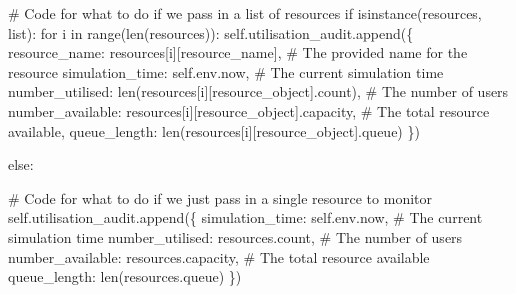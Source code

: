 \documentclass[
  letterpaper,
  DIV=11,
  numbers=noendperiod]{scrreprt}
\newenvironment{Shaded}{\begin{snugshade}}{\end{snugshade}}
\newcommand{\BuiltInTok}[1]{\textcolor[rgb]{0.00,0.23,0.31}{#1}}
\newcommand{\CommentTok}[1]{\textcolor[rgb]{0.37,0.37,0.37}{#1}}
\newcommand{\ControlFlowTok}[1]{\textcolor[rgb]{0.00,0.23,0.31}{#1}}
\newcommand{\KeywordTok}[1]{\textcolor[rgb]{0.00,0.23,0.31}{#1}}
\newcommand{\NormalTok}[1]{\textcolor[rgb]{0.00,0.23,0.31}{#1}}
\newcommand{\StringTok}[1]{\textcolor[rgb]{0.13,0.47,0.30}{#1}}
\newcommand{\VariableTok}[1]{\textcolor[rgb]{0.07,0.07,0.07}{#1}}
\begin{document}
\begin{tcolorbox}
\begin{Shaded}
\begin{Highlighting}[]
            \CommentTok{\# Code for what to do if we pass in a list of resources}
            \ControlFlowTok{if} \BuiltInTok{isinstance}\NormalTok{(resources, }\BuiltInTok{list}\NormalTok{):}
                \ControlFlowTok{for}\NormalTok{ i }\KeywordTok{in} \BuiltInTok{range}\NormalTok{(}\BuiltInTok{len}\NormalTok{(resources)):}
                    \VariableTok{self}\NormalTok{.utilisation\_audit.append(\{}
                        \StringTok{\textquotesingle{}resource\_name\textquotesingle{}}\NormalTok{: resources[i][}\StringTok{\textquotesingle{}resource\_name\textquotesingle{}}\NormalTok{], }\CommentTok{\# The provided name for the resource}
                        \StringTok{\textquotesingle{}simulation\_time\textquotesingle{}}\NormalTok{: }\VariableTok{self}\NormalTok{.env.now,  }\CommentTok{\# The current simulation time}
                        \StringTok{\textquotesingle{}number\_utilised\textquotesingle{}}\NormalTok{: }\BuiltInTok{len}\NormalTok{(resources[i][}\StringTok{\textquotesingle{}resource\_object\textquotesingle{}}\NormalTok{].count), }\CommentTok{\# The number of users}
                        \StringTok{\textquotesingle{}number\_available\textquotesingle{}}\NormalTok{: resources[i][}\StringTok{\textquotesingle{}resource\_object\textquotesingle{}}\NormalTok{].capacity, }\CommentTok{\# The total resource available,}
                        \StringTok{\textquotesingle{}queue\_length\textquotesingle{}}\NormalTok{: }\BuiltInTok{len}\NormalTok{(resources[i][}\StringTok{\textquotesingle{}resource\_object\textquotesingle{}}\NormalTok{].queue)}
\NormalTok{                    \})}

            \ControlFlowTok{else}\NormalTok{:}

                \CommentTok{\# Code for what to do if we just pass in a single resource to monitor}
                \VariableTok{self}\NormalTok{.utilisation\_audit.append(\{}
                    \StringTok{\textquotesingle{}simulation\_time\textquotesingle{}}\NormalTok{: }\VariableTok{self}\NormalTok{.env.now,  }\CommentTok{\# The current simulation time}
                    \StringTok{\textquotesingle{}number\_utilised\textquotesingle{}}\NormalTok{: resources.count,  }\CommentTok{\# The number of users}
                    \StringTok{\textquotesingle{}number\_available\textquotesingle{}}\NormalTok{: resources.capacity, }\CommentTok{\# The total resource available}
                    \StringTok{\textquotesingle{}queue\_length\textquotesingle{}}\NormalTok{: }\BuiltInTok{len}\NormalTok{(resources.queue)}
\NormalTok{                \})}



\end{Highlighting}
\end{Shaded}
\end{tcolorbox}
\end{document}
